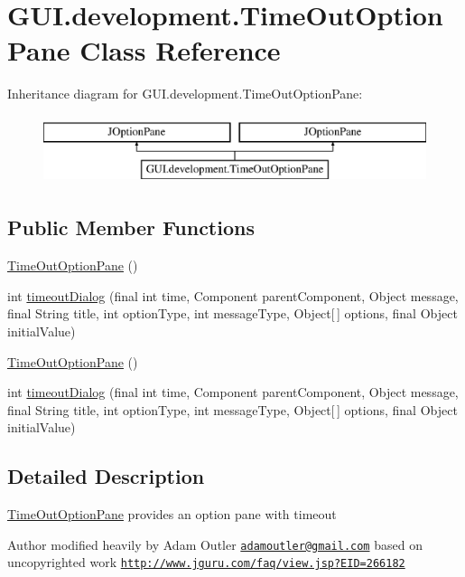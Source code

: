 \hypertarget{class_g_u_i_1_1development_1_1_time_out_option_pane}{\section{G\-U\-I.\-development.\-Time\-Out\-Option\-Pane Class Reference}
\label{class_g_u_i_1_1development_1_1_time_out_option_pane}
}
Inheritance diagram for G\-U\-I.\-development.\-Time\-Out\-Option\-Pane\-:\begin{figure}[H]
\begin{center}
\leavevmode
\includegraphics[height=2.000000cm]{class_g_u_i_1_1development_1_1_time_out_option_pane}
\end{center}
\end{figure}
\subsection*{Public Member Functions}
\begin{DoxyCompactItemize}
\item 
\hyperlink{class_g_u_i_1_1development_1_1_time_out_option_pane_accd0bbe0a3a759e4f0b31c2a61ece537}{Time\-Out\-Option\-Pane} ()
\item 
int \hyperlink{class_g_u_i_1_1development_1_1_time_out_option_pane_a76d2a6139406a26514ce249b41e4e748}{timeout\-Dialog} (final int time, Component parent\-Component, Object message, final String title, int option\-Type, int message\-Type, Object\mbox{[}$\,$\mbox{]} options, final Object initial\-Value)
\item 
\hyperlink{class_g_u_i_1_1development_1_1_time_out_option_pane_accd0bbe0a3a759e4f0b31c2a61ece537}{Time\-Out\-Option\-Pane} ()
\item 
int \hyperlink{class_g_u_i_1_1development_1_1_time_out_option_pane_a76d2a6139406a26514ce249b41e4e748}{timeout\-Dialog} (final int time, Component parent\-Component, Object message, final String title, int option\-Type, int message\-Type, Object\mbox{[}$\,$\mbox{]} options, final Object initial\-Value)
\end{DoxyCompactItemize}


\subsection{Detailed Description}
\hyperlink{class_g_u_i_1_1development_1_1_time_out_option_pane}{Time\-Out\-Option\-Pane} provides an option pane with timeout \begin{DoxyAuthor}{Author}
modified heavily by Adam Outler \href{mailto:adamoutler@gmail.com}{\tt adamoutler@gmail.\-com} based on uncopyrighted work \href{http://www.jguru.com/faq/view.jsp?EID=266182}{\tt http\-://www.\-jguru.\-com/faq/view.\-jsp?\-E\-I\-D=266182} 
\end{DoxyAuthor}


